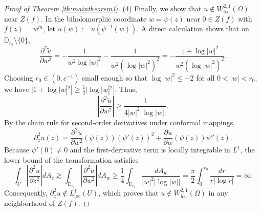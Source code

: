 \documentclass[12pt,twoside]{amsart}
\numberwithin{equation}{section}
\numberwithin{definition}{section} %
\begin{document}
\begin{proof}[Proof of Theorem \ref{th:maintheorem1}]
\medskip
\noindent (4) Finally, we show that $u \notin W_{\mathrm{loc}}^{2,1}(\Omega)$ near $Z(f)$. In the biholomorphic coordinate $w = \psi(z)$ near $0 \in Z(f)$ with $f(z) = w^m$, let $\widetilde{u}(w) := u(\psi^{-1}(w))$. A direct calculation shows that on $\mathbb{D}_{r_0} \setminus \{0\}$,
\begin{equation}\label{eq:4.12}
\frac{\partial^2 \widetilde{u}}{\partial w^2} = -\frac{1}{w^2 \log|w|^2} - \frac{1}{w^2 (\log|w|^2)^2} = -\frac{1 + \log|w|^2}{w^2 (\log|w|^2)^2}.
\end{equation}
Choosing $r_0 \in (0, e^{-1})$ small enough so that $\log|w|^2 \le -2$ for all $0 < |w| < r_0$, we have $|1 + \log|w|^2| \ge \frac{1}{2}|\log|w|^2|$. Thus,
\[
\left| \frac{\partial^2 \widetilde{u}}{\partial w^2} \right| \ge \frac{1}{4 |w|^2 |\log|w||}.
\]
By the chain rule for second-order derivatives under conformal mappings, $$\partial_{z}^2 u(z) = \frac{\partial^2 \widetilde{u}}{\partial w^2}(\psi(z)) (\psi'(z))^2 + \frac{\partial \widetilde{u}}{\partial w}(\psi(z)) \psi''(z).$$ Because $\psi'(0) \neq 0$ and the first-derivative term is locally integrable in $L^1$, the lower bound of the transformation satisfies
\[
\int_U \left| \frac{\partial^2 u}{\partial z^2} \right| dA_z \gtrsim \int_{\mathbb{D}_{r_0}} \left| \frac{\partial^2 \widetilde{u}}{\partial w^2} \right| dA_w \ge \frac{1}{4} \int_{\mathbb{D}_{r_0}} \frac{dA_w}{|w|^2 |\log|w||} = \frac{\pi}{2} \int_0^{r_0} \frac{dr}{r |\log r|} = \infty.
\]
Consequently, $\partial_z^2 u \notin L_{\mathrm{loc}}^1(U)$, which proves that $u \notin W_{\mathrm{loc}}^{2,1}(\Omega)$ in any neighborhood of $Z(f)$.
\end{proof}





\end{document}
